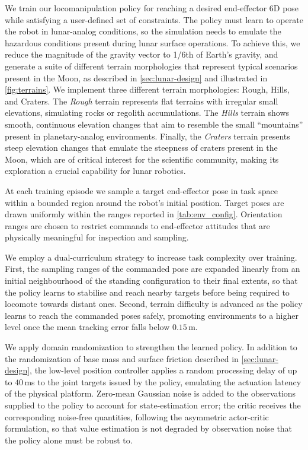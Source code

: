 We train our locomanipulation policy for reaching a desired end-effector 6D pose while satisfying a user-defined set of constraints. The policy must learn to operate the robot in lunar-analog conditions, so the simulation needs to emulate the hazardous conditions present during lunar surface operations. To achieve this, we reduce the magnitude of the gravity vector to 1/6th of Earth's gravity, and generate a suite of different terrain morphologies that represent typical scenarios present in the Moon, as described in \cref{sec:lunar-design} and illustrated in \cref{fig:terrains}. We implement three different terrain morphologies: Rough, Hills, and Craters. The \textit{Rough} terrain represents flat terrains with irregular small elevations, simulating rocks or regolith accumulations. The \textit{Hills} terrain shows smooth, continuous elevation changes that aim to resemble the small ``mountains'' present in planetary-analog environments. Finally, the \textit{Craters} terrain presents steep elevation changes that emulate the steepness of craters present in the Moon, which are of critical interest for the scientific community, making its exploration a crucial capability for lunar robotics.

At each training episode we sample a target end-effector pose in task space within a bounded region around the robot's initial position. Target poses are drawn uniformly within the ranges reported in \cref{tab:env_config}. Orientation ranges are chosen to restrict commands to end-effector attitudes that are
physically meaningful for inspection and sampling.

We employ a dual-curriculum strategy to increase task complexity over training. First, the sampling ranges of the commanded pose are expanded linearly from an initial neighbourhood of the standing configuration to their final extents, so that the policy learns to stabilise and reach nearby targets before being required to locomote towards distant ones. Second, terrain difficulty is advanced as the policy learns to reach the commanded poses safely, promoting environments to a higher level once the mean tracking error falls below $0.15\,$m.

We apply domain randomization to strengthen the learned policy. In addition to the randomization of base mass and surface friction described in \cref{sec:lunar-design}, the low-level position controller applies a random processing delay of up to $40\,$ms to the joint targets issued by the policy, emulating the actuation latency of the physical platform. Zero-mean Gaussian noise is added to the observations supplied to the policy to account for state-estimation error; the critic receives the corresponding noise-free quantities, following the asymmetric actor-critic formulation, so that value estimation is not degraded by observation noise that the policy alone must be robust to.

